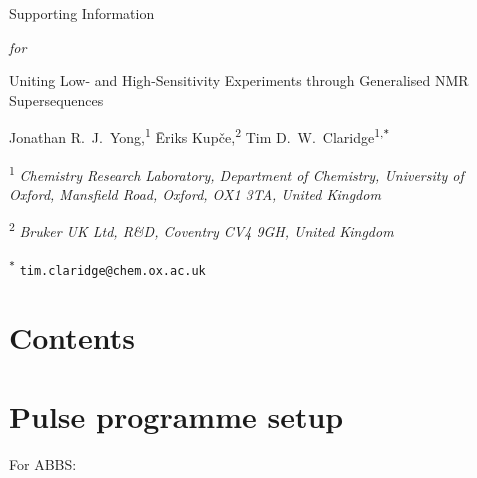 \documentclass[a4paper,12pt]{article}
\newcommand{\articletitle}{\todo{Uniting Low- and High-Sensitivity Experiments through Generalised NMR Supersequences}}
\newcommand{\crl}{Chemistry Research Laboratory, Department of Chemistry, University of Oxford, Mansfield Road, Oxford, OX1 3TA, United Kingdom}
\newcommand{\brukeruk}{Bruker UK Ltd, R\&D, Coventry CV4 9GH, United Kingdom}
\newcommand{\todo}[1]{{\color{OrangeRed}#1}}
\begin{document}

\clearpage
\begin{refsection}
\newcommand{\sectionbreak}{\clearpage}
\renewcommand*{\thefigure}{S\arabic{figure}}
\renewcommand*{\thesection}{S\arabic{section}}
\renewcommand*{\thetable}{S\arabic{table}}
\renewcommand*{\thepage}{S\arabic{page}}
\setcounter{page}{1}
\setcounter{figure}{0}
\setcounter{section}{0}
\setcounter{table}{0}
\onehalfspacing

\hspace{0pt}
\vfill
\begin{center}
    \huge
    Supporting Information

    \vspace{0.3cm}

    \textit{for}

    \vspace{0.3cm}

    \articletitle{}

    \vspace{0.6cm}

    \Large Jonathan R.\ J.\ Yong,\textsuperscript{1} {\=E}riks Kup{\v{c}}e,\textsuperscript{2} Tim D.\ W.\ Claridge\textsuperscript{1,\texttt{*}}

    \vspace{0.6cm}

    \large \textsuperscript{1} \textit{\crl{}}

    \textsuperscript{2} \textit{\brukeruk{}}

    \textsuperscript{\texttt{*}} \texttt{tim.claridge@chem.ox.ac.uk}

\end{center}

\vspace{2cm}
\section*{Contents}

\startcontents[si]
\vfill
\hspace{0pt}
\newpage

\section{Pulse programme setup}

For ABBS:


\end{refsection}
\end{document}
